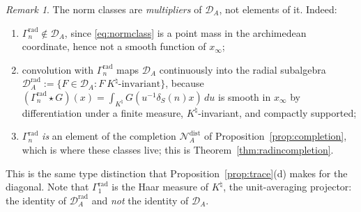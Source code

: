 \documentclass[11pt]{amsart}
\theoremstyle{definition}
\theoremstyle{remark}
\newtheorem{remark}[theorem]{Remark}
\newcommand{\Knat}{K^{\natural}}
\newcommand{\Drad}{\mathcal D_A^{\mathrm{rad}}}
\newcommand{\DA}{\mathcal D_A}
\begin{document}
\begin{remark}\label{rem:multiplier}
The norm classes are \emph{multipliers} of $\DA$, not elements of it. Indeed:
\begin{enumerate}
\item[(i)] $\Gamma_n^{\mathrm{rad}}\notin\DA$, since \eqref{eq:normclass} is a
point mass in the archimedean coordinate, hence not a smooth function of
$x_\infty$;
\item[(ii)] convolution with $\Gamma_n^{\mathrm{rad}}$ maps $\DA$ continuously
into the radial subalgebra $\Drad:=\{F\in\DA:F\ \Knat\text{-invariant}\}$,
because $(\Gamma_n^{\mathrm{rad}}\star G)(x)=\int_{\Knat}
G(u^{-1}\delta_S(n)x)\,du$ is smooth in $x_\infty$ by differentiation under a
finite measure, $\Knat$-invariant, and compactly supported;
\item[(iii)] $\Gamma_n^{\mathrm{rad}}$ \emph{is} an element of the completion
$\mathcal N_A^{\mathrm{dist}}$ of Proposition~\ref{prop:completion}, which is
where these classes live; this is Theorem~\ref{thm:radincompletion}.
\end{enumerate}
This is the same type distinction that Proposition~\ref{prop:trace}(d) makes
for the diagonal. Note that $\Gamma_1^{\mathrm{rad}}$ is the Haar measure of
$\Knat$, the unit-averaging projector: the identity of $\Drad$ and \emph{not}
the identity of $\DA$.
\end{remark}
\end{document}

